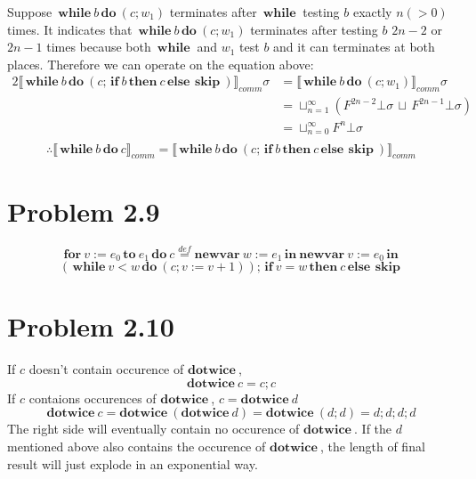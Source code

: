 \documentclass[a4papers]{ctexart}
\newcommand{\bif}{\,\boldsymbol{if}\ }
\newcommand{\belse}{\,\boldsymbol{else}\ }
\newcommand{\bthen}{\,\boldsymbol{then}\ }
\newcommand{\bskip}{\,\boldsymbol{skip}\  }
\newcommand{\bwhile}{\,\boldsymbol{while}\ }
\newcommand{\bdo}{\,\boldsymbol{do}\ }
\newcommand{\bdotwice}{\boldsymbol{dotwice}\ }
\newcommand{\bin}{\,\boldsymbol{in}\ }
\newcommand{\bnewvar}{\boldsymbol{newvar}\ }
\newcommand{\bfor}{\,\boldsymbol{for}\ }
\newcommand{\bto}{\,\boldsymbol{to}\ }
\newcommand{\commBlock}[1]{\llbracket {#1} \rrbracket_{comm}}
\begin{document}
Suppose $\bwhile b \bdo (c;w_1)$ terminates after $\bwhile$ testing $b$ exactly $n(>0)$ times.
It indicates that $\bwhile b \bdo (c;w_1)$ terminates after testing $b$  $2n-2$ or $2n-1$ times
because both $\bwhile$ and $w_1$ test $b$ and it can terminates at both places.
Therefore we can operate on the equation above:
\begin{alignat*}{2}
    \commBlock{\bwhile b \bdo (c;\bif b \bthen c \belse \bskip)}\sigma 
    &= \commBlock{\bwhile b \bdo (c;w_1)}\sigma \\
    &= \sqcup_{n=1}^{\infty}( F^{2n-2}\bot\sigma \, \sqcup \, F^{2n-1}\bot\sigma)\\
    &= \sqcup_{n=0}^{\infty}F^n\bot\sigma\\
\end{alignat*}
\[ \therefore \commBlock{\bwhile b \bdo c}
= \commBlock{\bwhile b \bdo (c;\bif b \bthen c \belse \bskip)}
\]



\section{Problem 2.9}
\[ \bfor v:=e_0 \bto e_1 \bdo c \overset{def}= \bnewvar w:=e_1 \bin \bnewvar v:=e_0 \bin\]
\[ (\bwhile v < w \bdo (c;v:=v+1)); \bif v = w \bthen c \belse \bskip\]


\section{Problem 2.10}
\noindent If $c$ doesn't contain occurence of $\bdotwice$, 
\[ \bdotwice c = c;c\]
If $c$ contaions occurences of $\bdotwice$, $c = \bdotwice d$
\[ \bdotwice c = \bdotwice (\bdotwice d) = \bdotwice (d;d) = d;d;d;d \]
The right side will eventually contain no occurence of $\bdotwice$. If the $d$ mentioned above also contains the occurence
of $\bdotwice$, the length of final result will just explode in an exponential way.
\end{document}
